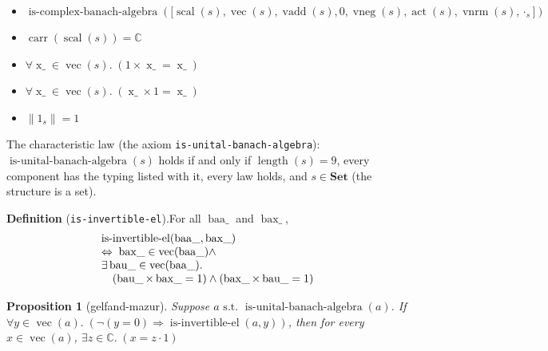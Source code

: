 \documentclass[11pt]{article}
\theoremstyle{plain}
\newtheorem*{proposition*}{Proposition}
\providecommand{\norm}[1]{\left\lVert #1 \right\rVert}
\begin{document}
\begin{itemize}[nosep]
\item
\begin{equation*}
\operatorname{is\text{-}complex\text{-}banach\text{-}algebra}({[}\operatorname{scal}(s), \operatorname{vec}(s), \operatorname{vadd}(s), 0, \operatorname{vneg}(s), \operatorname{act}(s), \operatorname{vnrm}(s), \cdot_{s}])
\end{equation*}

\item $\operatorname{carr}(\operatorname{scal}(s)) = \mathbb{C}$
\item $\forall \operatorname{x\_} \in \operatorname{vec}(s).\; (1 \times \operatorname{x\_} = \operatorname{x\_})$
\item $\forall \operatorname{x\_} \in \operatorname{vec}(s).\; (\operatorname{x\_} \times 1 = \operatorname{x\_})$
\item $\norm{1_{s}} = 1$
\end{itemize}
The characteristic law (the axiom \texttt{is-unital-banach-algebra}): $\operatorname{is\text{-}unital\text{-}banach\text{-}algebra}(s)$ holds if and only if $\operatorname{length}(s) = 9$, every component has the typing listed with it, every law holds, and $s \in \mathbf{Set}$ (the structure is a set).

\par\medskip\noindent\textbf{Definition} (\texttt{is-invertible-el}).\;For all $\operatorname{baa\_}$ and $\operatorname{bax\_}$, 
\begin{equation*}
\begin{array}{@{}l@{}} \operatorname{is\text{-}invertible\text{-}el}(\operatorname{baa\_}, \operatorname{bax\_}) \\ \Leftrightarrow\; \operatorname{bax\_} \in \operatorname{vec}(\operatorname{baa\_}) \wedge \\ \exists \operatorname{bau\_} \in \operatorname{vec}(\operatorname{baa\_}). \\ \quad (\operatorname{bau\_} \times \operatorname{bax\_} = 1) \wedge (\operatorname{bax\_} \times \operatorname{bau\_} = 1) \end{array}
\end{equation*}

\bigskip

\begin{proposition*}[gelfand-mazur]
Suppose $a \text{ s.t. } \operatorname{is\text{-}unital\text{-}banach\text{-}algebra}(a)$. If $\forall y \in \operatorname{vec}(a).\; (\neg (y = 0) \Rightarrow \operatorname{is\text{-}invertible\text{-}el}(a, y))$, then for every $x \in \operatorname{vec}(a)$,  $\exists z \in \mathbb{C}.\; (x = z \cdot 1)$
\end{proposition*}
\end{document}
